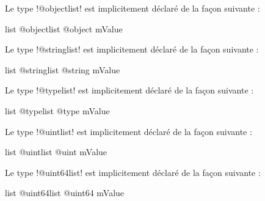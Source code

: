 
Le type \ggs!@objectlist! est implicitement déclaré de la façon suivante :

\begin{galgasbox}
list @objectlist {
  @object mValue
}
\end{galgasbox}






Le type \ggs!@stringlist! est implicitement déclaré de la façon suivante :

\begin{galgasbox}
list @stringlist {
  @string mValue
}
\end{galgasbox}








Le type \ggs!@typelist! est implicitement déclaré de la façon suivante :

\begin{galgasbox}
list @typelist {
  @type mValue
}
\end{galgasbox}






Le type \ggs!@uintlist! est implicitement déclaré de la façon suivante :

\begin{galgasbox}
list @uintlist {
  @uint mValue
}
\end{galgasbox}







Le type \ggs!@uint64list! est implicitement déclaré de la façon suivante :

\begin{galgasbox}
list @uint64list {
  @uint64 mValue
}
\end{galgasbox}

